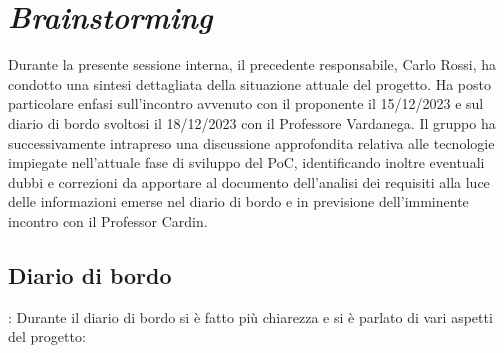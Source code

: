 \section{\textit{Brainstorming}}

Durante la presente sessione interna, il precedente responsabile, Carlo Rossi, ha condotto 
una sintesi dettagliata della situazione attuale del progetto. Ha posto particolare enfasi 
sull'incontro avvenuto con il proponente il 15/12/2023 e sul diario di bordo svoltosi il 
18/12/2023 con il Professore Vardanega. Il gruppo ha successivamente intrapreso una discussione 
approfondita relativa alle tecnologie impiegate nell'attuale fase di sviluppo del PoC, 
identificando inoltre eventuali dubbi e correzioni da apportare al documento dell'analisi 
dei requisiti alla luce delle informazioni emerse nel diario di bordo e in previsione 
dell'imminente incontro con il Professor Cardin.
\\

\subsection*{Diario di bordo}:
Durante il diario di bordo si è fatto più chiarezza e si è parlato di vari aspetti del progetto:


